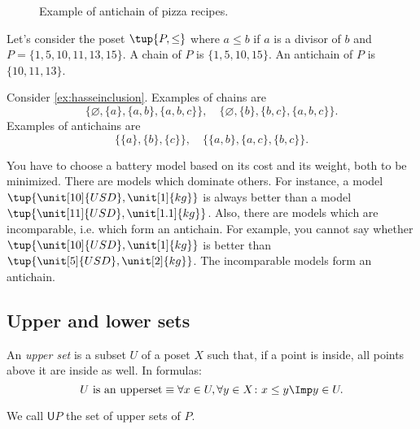 \begin{figure}[h!]
\begin{center}
\end{center}
\caption{Example of antichain of pizza recipes. \label{fig:antichain}}
\end{figure}


\begin{example}
Let's consider the poset $\tup{P,\leq}$ where $a\leq b$ if $a$ is a divisor of $b$ and $P=\{1,5,10,11,13,15\}$. A chain of $P$ is $\{1,5,10,15\}$. An antichain of $P$ is $\{10,11,13\}$.
\end{example}

\begin{example}
Consider \cref{ex:hasseinclusion}. Examples of chains are 
\begin{equation}
    \{\varnothing,\{a\},\{a,b\},\{a,b,c\}\}, \quad  \{\varnothing,\{b\},\{b,c\},\{a,b,c\}\}.
\end{equation}
Examples of antichains are
\begin{equation}
    \{\{a\},\{b\},\{c\}\}, \quad \{ \{a,b\},\{a,c\}, \{b,c\}\}.
\end{equation}
\end{example}

\begin{example}
\label{ex:battery}
You have to choose a battery model based on its cost and its weight, both to be minimized. There are models which dominate others. For instance, a model $\tup{\unit[10]{USD},\unit[1]{kg}}$ is always better than a model $\tup{\unit[11]{USD},\unit[1.1]{kg}}$. Also, there are models which are incomparable, i.e. which form an antichain. For example, you cannot say whether $\tup{\unit[10]{USD},\unit[1]{kg}}$ is better than  $\tup{\unit[5]{USD},\unit[2]{kg}}$. The incomparable models form an antichain.
\end{example}

\subsection{Upper and lower sets}

\begin{definition}
\label{def:upperset}
An \emph{upper set} is a subset $U$ of a poset $X$ such
that, if a point is inside, all points above it are inside as well.
In formulas:
\begin{equation}
\text{$U$ is an upperset} \equiv \forall x\in U, \forall y\in X\colon x\leq y \Imp y\in U.
\end{equation}
\end{definition}
\begin{remark}
We call $\mathsf{U}P$ the set of upper sets of $P$.
\end{remark}



